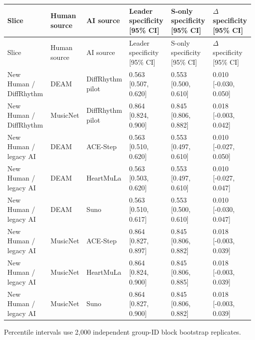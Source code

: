 \begin{longtable}{p{2.6cm}p{1.8cm}p{1.8cm}p{2.7cm}p{2.7cm}p{2.7cm}}
\toprule
Slice & Human source & AI source & Leader specificity [95\% CI] & S-only specificity [95\% CI] & $\Delta$ specificity [95\% CI] \\
\midrule
\endfirsthead
\toprule
Slice & Human source & AI source & Leader specificity [95\% CI] & S-only specificity [95\% CI] & $\Delta$ specificity [95\% CI] \\
\midrule
\endhead
New Human / DiffRhythm & DEAM & DiffRhythm pilot & 0.563 [0.507, 0.620] & 0.553 [0.500, 0.610] & 0.010 [-0.030, 0.050] \\
New Human / DiffRhythm & MusicNet & DiffRhythm pilot & 0.864 [0.824, 0.900] & 0.845 [0.806, 0.882] & 0.018 [-0.003, 0.042] \\
New Human / legacy AI & DEAM & ACE-Step & 0.563 [0.510, 0.620] & 0.553 [0.497, 0.610] & 0.010 [-0.027, 0.050] \\
New Human / legacy AI & DEAM & HeartMuLa & 0.563 [0.503, 0.620] & 0.553 [0.497, 0.610] & 0.010 [-0.027, 0.047] \\
New Human / legacy AI & DEAM & Suno & 0.563 [0.510, 0.617] & 0.553 [0.500, 0.610] & 0.010 [-0.030, 0.047] \\
New Human / legacy AI & MusicNet & ACE-Step & 0.864 [0.827, 0.897] & 0.845 [0.806, 0.882] & 0.018 [-0.003, 0.039] \\
New Human / legacy AI & MusicNet & HeartMuLa & 0.864 [0.824, 0.900] & 0.845 [0.806, 0.885] & 0.018 [-0.003, 0.039] \\
New Human / legacy AI & MusicNet & Suno & 0.864 [0.827, 0.900] & 0.845 [0.806, 0.882] & 0.018 [-0.003, 0.039] \\
\bottomrule
\end{longtable}
{\footnotesize Percentile intervals use 2,000 independent group-ID block bootstrap replicates.}
